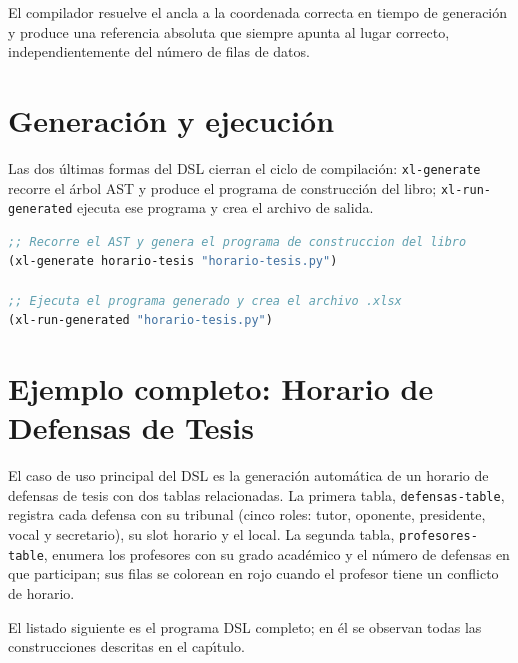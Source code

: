 El compilador resuelve el ancla a la coordenada correcta en tiempo de
generaci\'on y produce una referencia absoluta que siempre apunta al lugar
correcto, independientemente del n\'umero de filas de datos.

\section{Generaci\'on y ejecuci\'on}
\label{sec:generacion-dsl}

Las dos \'ultimas formas del DSL cierran el ciclo de compilaci\'on:
\texttt{xl-generate} recorre el \'arbol AST y produce el programa de
construcci\'on del libro; \texttt{xl-run-generated} ejecuta ese programa
y crea el archivo de salida.

\begin{lstlisting}[language=CommonLisp,
  caption={Compilaci\'on del AST y ejecuci\'on.}]
;; Recorre el AST y genera el programa de construccion del libro
(xl-generate horario-tesis "horario-tesis.py")

;; Ejecuta el programa generado y crea el archivo .xlsx
(xl-run-generated "horario-tesis.py")
\end{lstlisting}

\section{Ejemplo completo: Horario de Defensas de Tesis}
\label{sec:ejemplo-completo}

El caso de uso principal del DSL es la generaci\'on autom\'atica de un
horario de defensas de tesis con dos tablas relacionadas.  La primera tabla,
\texttt{defensas-table}, registra cada defensa con su tribunal (cinco roles:
tutor, oponente, presidente, vocal y secretario), su slot horario y el local.
La segunda tabla, \texttt{profesores-table}, enumera los profesores con su
grado acad\'emico y el n\'umero de defensas en que participan; sus filas se
colorean en rojo cuando el profesor tiene un conflicto de horario.

El listado siguiente es el programa DSL completo; en \'el se observan todas
las construcciones descritas en el cap\'{\i}tulo.

